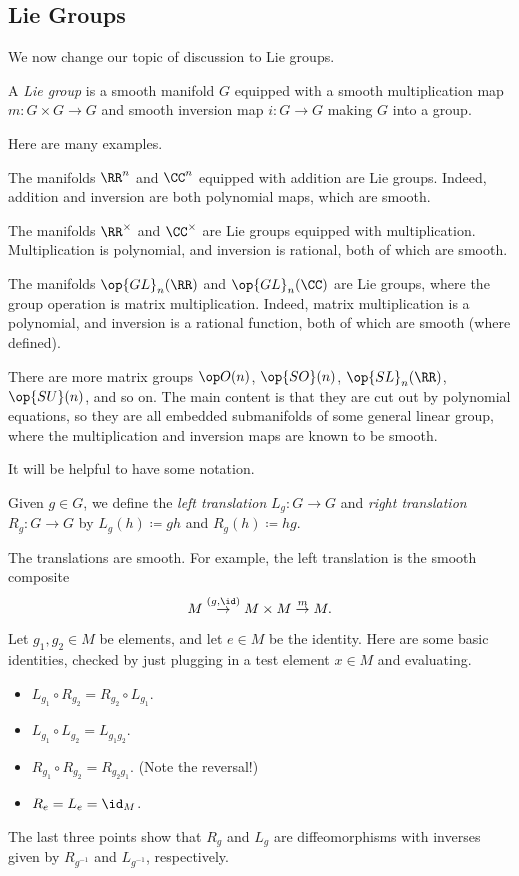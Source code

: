 \documentclass[../notes.tex]{subfiles}
\begin{document}
\subsection{Lie Groups}
We now change our topic of discussion to Lie groups.
\begin{definition}
	A \textit{Lie group} is a smooth manifold $G$ equipped with a smooth multiplication map $m\colon G\times G\to G$ and smooth inversion map $i\colon G\to G$ making $G$ into a group.
\end{definition}
Here are many examples.
\begin{example}
	The manifolds $\RR^n$ and $\CC^n$ equipped with addition are Lie groups. Indeed, addition and inversion are both polynomial maps, which are smooth.
\end{example}
\begin{example}
	The manifolds $\RR^\times$ and $\CC^\times$ are Lie groups equipped with multiplication. Multiplication is polynomial, and inversion is rational, both of which are smooth.
\end{example}
\begin{example}
	The manifolds $\op{GL}_n(\RR)$ and $\op{GL}_n(\CC)$ are Lie groups, where the group operation is matrix multiplication. Indeed, matrix multiplication is a polynomial, and inversion is a rational function, both of which are smooth (where defined).
\end{example}
\begin{example}
	There are more matrix groups $\op O(n)$, $\op{SO}(n)$, $\op{SL}_n(\RR)$, $\op{SU}(n)$, and so on. The main content is that they are cut out by polynomial equations, so they are all embedded submanifolds of some general linear group, where the multiplication and inversion maps are known to be smooth.
\end{example}
It will be helpful to have some notation.
\begin{definition}
	Given $g\in G$, we define the \textit{left translation} $L_g\colon G\to G$ and \textit{right translation} $R_g\colon G\to G$ by $L_g(h)\coloneqq gh$ and $R_g(h)\coloneqq hg$.
\end{definition}
\begin{remark}
	The translations are smooth. For example, the left translation is the smooth composite
	\[M\stackrel{(g,{\id})}\to M\times M\stackrel m\to M.\]
\end{remark}
\begin{remark} \label{rem:translate-diffeo}
	Let $g_1,g_2\in M$ be elements, and let $e\in M$ be the identity. Here are some basic identities, checked by just plugging in a test element $x\in M$ and evaluating.
	\begin{itemize}
		\item $L_{g_1}\circ R_{g_2}=R_{g_2}\circ L_{g_1}$.
		\item $L_{g_1}\circ L_{g_2}=L_{g_1g_2}$.
		\item $R_{g_1}\circ R_{g_2}=R_{g_2g_1}$. (Note the reversal!)
		\item $R_e=L_e=\id_M$.
	\end{itemize}
	The last three points show that $R_g$ and $L_g$ are diffeomorphisms with inverses given by $R_{g^{-1}}$ and $L_{g^{-1}}$, respectively.
\end{remark}
\end{document}
